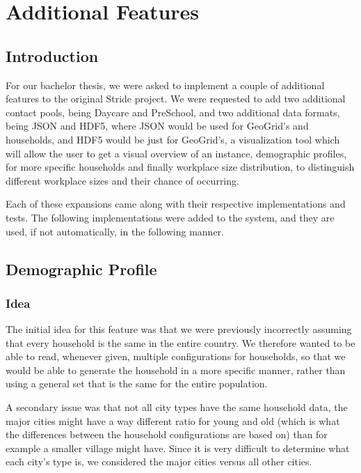 \chapter{Additional Features}
\label{chap:code}


\section{Introduction}
\label{section:AdditionalFeatureIntro}

For our bachelor thesis, we were asked to implement a couple of additional features to the original Stride project. We were requested to add two additional contact pools, being Daycare and PreSchool, and two additional data formats, being JSON and HDF5, where JSON would be used for GeoGrid's and households, and HDF5 would be just for GeoGrid's, a visualization tool which will allow the user to get a visual overview of an instance, demographic profiles, for more specific households and finally workplace size distribution, to distinguish different workplace sizes and their chance of occurring.

Each of these expansions came along with their respective implementations and tests. The following implementations were added to the system, and they are used, if not automatically, in the following manner.



\section{Demographic Profile}
\label{section:demographicprofile}

\subsection{Idea}

The initial idea for this feature was that we were previously incorrectly assuming that every household is the same in the entire country. We therefore wanted to be able to read, whenever given, multiple configurations for households, so that we would be able to generate the household in a more specific manner, rather than using a general set that is the same for the entire population.

A secondary issue was that not all city types have the same household data, the major cities might have a way different ratio for young and old (which is what the differences between the household configurations are based on) than for example a smaller village might have. Since it is very difficult to determine what each city's type is, we considered the major cities versus all other cities.


